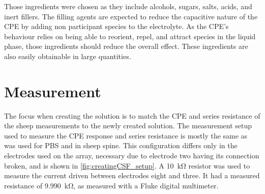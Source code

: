   Those ingredients were chosen as they include alcohols, sugars, salts, acids, and inert fillers.
  The filling agents are expected to reduce the capacitive nature of the CPE by adding non participant species to the electrolyte.
  As the CPE's behaviour relies on being able to reorient, repel, and attract species in the liquid phase, those ingredients should reduce the overall effect.
  These ingredients are also easily obtainable in large quantities.


\section{Measurement}

  The focus when creating the solution is to match the CPE and series resistance of the sheep measurements to the newly created solution.
  The measurement setup used to measure the CPE response and series resistance is mostly the same as was used for PBS and in sheep spine.
  This configuration differs only in the electrodes used on the array, necessary due to electrode two having its connection broken, and is shown in \cref{fig:creatingCSF_setup}.
  A \SI{10}{\kilo\ohm} resistor was used to measure the current driven between electrodes eight and three.
  It had a measured resistance of \SI{9.990}{\kilo\ohm}, as measured with a Fluke digital multimeter.

